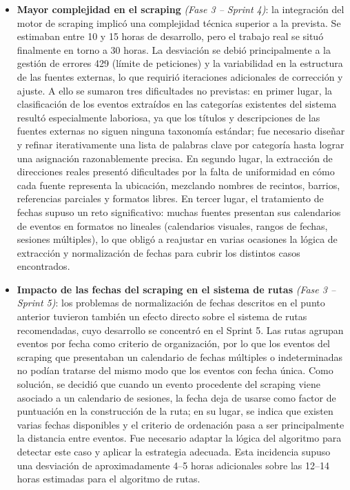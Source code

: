 \begin{itemize}
    \item \textbf{Mayor complejidad en el scraping} \textit{(Fase 3 – Sprint 4)}: la integración del motor de scraping implicó una complejidad técnica superior a la prevista. Se estimaban entre 10 y 15 horas de desarrollo, pero el trabajo real se situó finalmente en torno a 30 horas. La desviación se debió principalmente a la gestión de errores 429 (límite de peticiones) y la variabilidad en la estructura de las fuentes externas, lo que requirió iteraciones adicionales de corrección y ajuste. A ello se sumaron tres dificultades no previstas: en primer lugar, la clasificación de los eventos extraídos en las categorías existentes del sistema resultó especialmente laboriosa, ya que los títulos y descripciones de las fuentes externas no siguen ninguna taxonomía estándar; fue necesario diseñar y refinar iterativamente una lista de palabras clave por categoría hasta lograr una asignación razonablemente precisa. En segundo lugar, la extracción de direcciones reales presentó dificultades por la falta de uniformidad en cómo cada fuente representa la ubicación, mezclando nombres de recintos, barrios, referencias parciales y formatos libres. En tercer lugar, el tratamiento de fechas supuso un reto significativo: muchas fuentes presentan sus calendarios de eventos en formatos no lineales (calendarios visuales, rangos de fechas, sesiones múltiples), lo que obligó a reajustar en varias ocasiones la lógica de extracción y normalización de fechas para cubrir los distintos casos encontrados.

    \item \textbf{Impacto de las fechas del scraping en el sistema de rutas} \textit{(Fase 3 – Sprint 5)}: los problemas de normalización de fechas descritos en el punto anterior tuvieron también un efecto directo sobre el sistema de rutas recomendadas, cuyo desarrollo se concentró en el Sprint 5. Las rutas agrupan eventos por fecha como criterio de organización, por lo que los eventos del scraping que presentaban un calendario de fechas múltiples o indeterminadas no podían tratarse del mismo modo que los eventos con fecha única. Como solución, se decidió que cuando un evento procedente del scraping viene asociado a un calendario de sesiones, la fecha deja de usarse como factor de puntuación en la construcción de la ruta; en su lugar, se indica que existen varias fechas disponibles y el criterio de ordenación pasa a ser principalmente la distancia entre eventos. Fue necesario adaptar la lógica del algoritmo para detectar este caso y aplicar la estrategia adecuada. Esta incidencia supuso una desviación de aproximadamente 4--5 horas adicionales sobre las 12--14 horas estimadas para el algoritmo de rutas.


\end{itemize}
